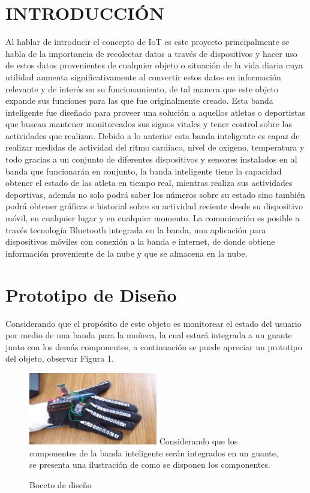 \documentclass[osajnl,twocolumn,showpacs,superscriptaddress,10pt]{revtex4-1}
\begin{document}
\section{INTRODUCCIÓN}
Al hablar de introducir el concepto de IoT es este proyecto principalmente se habla de la importancia de recolectar datos a través de dispositivos y hacer uso de estos datos provenientes de cualquier objeto o situación de la vida diaria cuya utilidad aumenta significativamente al convertir estos datos en información relevante y de interés en su funcionamiento, de tal manera que este objeto expande sus funciones para las que fue originalmente creado. Esta banda inteligente fue diseñado para proveer una solución a aquellos atletas o deportistas que buscan mantener monitoreados sus signos vitales y tener control sobre las actividades que realizan. Debido a lo anterior esta banda inteligente es capaz de realizar medidas de actividad del ritmo cardiaco, nivel de oxigeno, temperatura y todo gracias a un conjunto de diferentes dispositivos y sensores instalados en al banda que funcionarán en conjunto, la banda inteligente tiene la capacidad obtener el estado de las atleta en tiempo real, mientras realiza sus actividades deportivas, además no solo podrá saber los números sobre su estado sino también podrá obtener gráficas e historial sobre su actividad reciente desde su dispositivo móvil, en cualquier lugar y en cualquier momento. La comunicación es posible a través tecnología Bluetooth integrada en la banda, una aplicación para dispositivos móviles con conexión a la banda e internet, de donde obtiene información proveniente de la nube y que se almacena en la nube.

\section{Prototipo de Diseño}
Considerando que el propósito de este objeto es monitorear el estado del usuario por medio de una banda para la muñeca, la cual estará integrada a un guante junto con los demás componentes, a continuación se puede apreciar un prototipo del objeto, observar Figura 1.


\begin{figure} [H] \centering 
\caption{Boceto de diseño}

\includegraphics[width=0.5\textwidth]{prototipo.jpg} 
Considerando que los componentes de la banda inteligente serán integrados en un guante, se presenta una ilustración de como se disponen los componentes. 
\end{figure}
\end{document}
